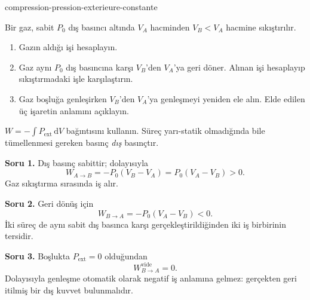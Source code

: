 \begin{exo}{compression-pression-exterieure-constante}

Bir gaz, sabit $P_0$ dış basıncı altında $V_A$ hacminden $V_B<V_A$ hacmine sıkıştırılır.

\begin{enumerate}
\item Gazın aldığı işi hesaplayın.
\item Gaz aynı $P_0$ dış basıncına karşı $V_B$'den $V_A$'ya geri döner. Alınan işi hesaplayıp sıkıştırmadaki işle karşılaştırın.
\item Gaz boşluğa genleşirken $V_B$'den $V_A$'ya genleşmeyi yeniden ele alın. Elde edilen üç işaretin anlamını açıklayın.
\end{enumerate}

\begin{indication}
$W=-\int P_{\mathrm{ext}}\,\mathrm{d}V$ bağıntısını kullanın. Süreç yarı-statik
olmadığında bile tümellenmesi gereken basınç \emph{dış} basınçtır.
\end{indication}

\begin{solution}
\textbf{Soru 1.} Dış basınç sabittir; dolayısıyla
\[
W_{A\to B}=-P_0(V_B-V_A)=P_0(V_A-V_B)>0.
\]
Gaz sıkıştırma sırasında iş alır.

\textbf{Soru 2.} Geri dönüş için
\[
W_{B\to A}=-P_0(V_A-V_B)<0.
\]
İki süreç de aynı sabit dış basınca karşı gerçekleştirildiğinden iki iş birbirinin tersidir.

\textbf{Soru 3.} Boşlukta $P_{\mathrm{ext}}=0$ olduğundan
\[
W_{B\to A}^{\mathrm{vide}}=0.
\]
Dolayısıyla genleşme otomatik olarak negatif iş anlamına gelmez: gerçekten
geri itilmiş bir dış kuvvet bulunmalıdır.
\end{solution}
\end{exo}
